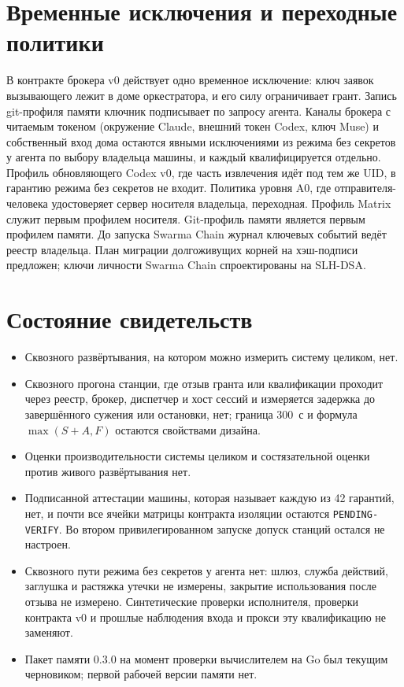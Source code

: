 \documentclass[10pt,a4paper]{article}
\begin{document}
\section{Временные исключения и переходные политики}

В контракте брокера v0 действует одно временное исключение: ключ заявок вызывающего лежит в доме оркестратора, и его силу ограничивает грант. Запись git-профиля памяти ключник подписывает по запросу агента. Каналы брокера с читаемым токеном (окружение Claude, внешний токен Codex, ключ Muse) и собственный вход дома остаются явными исключениями из режима без секретов у агента по выбору владельца машины, и каждый квалифицируется отдельно. Профиль обновляющего Codex v0, где часть извлечения идёт под тем же UID, в гарантию режима без секретов не входит. Политика уровня A0, где отправителя-человека удостоверяет сервер носителя владельца, переходная. Профиль Matrix служит первым профилем носителя. Git-профиль памяти является первым профилем памяти. До запуска Swarma Chain журнал ключевых событий ведёт реестр владельца. План миграции долгоживущих корней на хэш-подписи предложен; ключи личности Swarma Chain спроектированы на SLH-DSA.

\section{Состояние свидетельств}

\begin{itemize}
\item Сквозного развёртывания, на котором можно измерить систему целиком, нет.
\item Сквозного прогона станции, где отзыв гранта или квалификации проходит через реестр, брокер, диспетчер и хост сессий и измеряется задержка до завершённого сужения или остановки, нет; граница 300~с и формула $\max(S+A,F)$ остаются свойствами дизайна.
\item Оценки производительности системы целиком и состязательной оценки против живого развёртывания нет.
\item Подписанной аттестации машины, которая называет каждую из 42 гарантий, нет, и почти все ячейки матрицы контракта изоляции остаются \texttt{PENDING-VERIFY}. Во втором привилегированном запуске допуск станций остался не настроен.
\item Сквозного пути режима без секретов у агента нет: шлюз, служба действий, заглушка и растяжка утечки не измерены, закрытие использования после отзыва не измерено. Синтетические проверки исполнителя, проверки контракта v0 и прошлые наблюдения входа и прокси эту квалификацию не заменяют.
\item Пакет памяти 0.3.0 на момент проверки вычислителем на Go был текущим черновиком; первой рабочей версии памяти нет.
\end{itemize}
\end{document}
